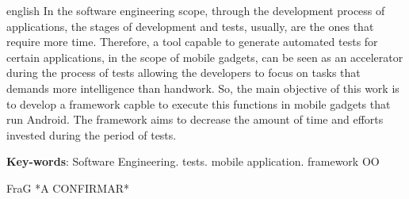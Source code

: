 \documentclass[
    12pt,       %
    openright,      %
    twoside,      %
    a4paper,      %
    english,      %
    french,       %
    spanish,      %
    brazil,       %
    ]{abntex2}
\begin{document}
  \begin{resumo}[Abstract]
   \begin{otherlanguage*}{english}
     In the software engineering scope, through the development process of
     applications, the stages of development and tests, usually, are the
     ones that require more time. Therefore, a tool capable to generate
     automated tests for certain applications, in the scope of mobile
     gadgets, can be seen as an accelerator during the process of
     tests allowing the developers to focus on tasks that demands
     more intelligence than handwork. So, the main objective of this work
     is to develop a framework capble to execute this functions in mobile
     gadgets that run Android. The framework aims to decrease the amount of
     time and efforts invested during the period of tests.

     \vspace{\onelineskip}

     \noindent
     \textbf{Key-words}: Software Engineering. tests. mobile application. framework OO
   \end{otherlanguage*}
  \end{resumo}

  \listoffigures*
  \cleardoublepage

  \listoftables*
  \cleardoublepage

  \begin{siglas}
    \item[FraG] *A CONFIRMAR*
  \end{siglas}

  \tableofcontents*
  \cleardoublepage



  \textual


\end{document}
